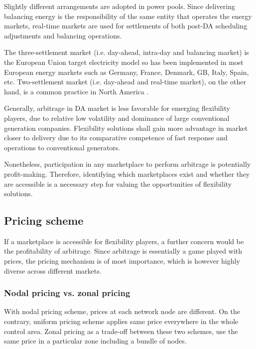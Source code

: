 Slightly different arrangements are adopted in power pools. Since delivering balancing energy is the responsibility of the  same entity that operates the energy markets, real-time markets are used for settlements of both post-DA scheduling adjustments and balancing operations.

The three-settlement market (i.e. day-ahead, intra-day and balancing market) is the European Union target electricity model \cite{EuropeanCommission2016} so has been implemented in most European energy markets such as Germany, France, Denmark, GB, Italy, Spain, etc.  Two-settlement market (i.e. day-ahead and real-time market), on the other hand, is a common practice in North America  \cite{Cochran2013}.

Generally, arbitrage in DA market is less favorable for emerging flexibility players, due to relative low volatility and dominance of large conventional generation companies. Flexibility solutions shall gain more advantage in market closer to delivery due to its comparative competence of fast response and operations to conventional generators. 

Nonetheless, participation in any marketplace to perform arbitrage is potentially profit-making. Therefore, identifying which marketplaces exist and whether they are accessible is a necessary step for valuing the opportunities of flexibility solutions.

\subsection{Pricing scheme}
If a marketplace is accessible for flexibility players, a further concern would be the profitability of arbitrage. Since arbitrage is essentially a game played with prices, the pricing mechanism is of most importance, which is however highly diverse across different markets.

\subsubsection{Nodal pricing vs. zonal pricing}
With nodal pricing scheme, prices at each network node are different. On the contrary, uniform pricing scheme applies same price everywhere in the whole control area. Zonal pricing as a trade-off between these two schemes, use the same price in a particular zone including a bundle of nodes.

